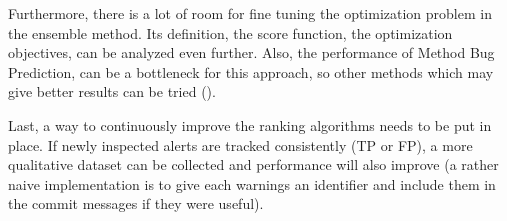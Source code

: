 Furthermore, there is a lot of room for fine tuning the optimization problem in the ensemble method. Its definition, the score function, the optimization objectives, can be analyzed even further. Also, the performance of Method Bug Prediction, can be a bottleneck for this approach, so other methods which may give better results can be tried (\cite{predict_deeplearning, dl_jit_prediction}).

Last, a way to continuously improve the ranking algorithms needs to be put in place. If newly inspected alerts are tracked consistently (TP or FP), a more qualitative dataset can be collected and performance will also improve (a rather naive implementation is to give each warnings an identifier and include them in the commit messages if they were useful).

